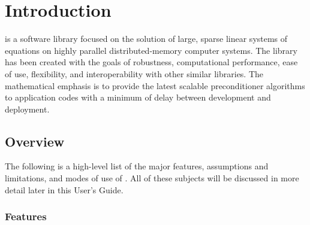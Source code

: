 \chapter{Introduction}
\label{Introduction}

\hypre{} is a software library focused on the solution of large, sparse linear
systems of equations on highly parallel distributed-memory computer
systems. The library has been created with the goals of robustness,
computational performance, ease of use, flexibility, and interoperability
with other similar libraries. The mathematical emphasis is to provide
the latest scalable preconditioner algorithms to application codes
with a minimum of delay between development and deployment.

\section{Overview}

The following is a high-level list of the major features, assumptions and
limitations, and modes of use of 
\hypre{}. All of these subjects will be discussed in more detail later in this
User's Guide.

\subsection{Features}


